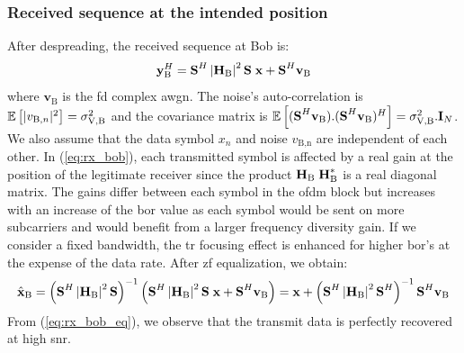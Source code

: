 \subsubsection{Received sequence at the intended position}
After despreading, the received sequence at Bob is:
\begin{equation}
    \textbf{y}_{\text{B}}^H = \textbf{S}^H  \left|\textbf{H}_{\text{B}}\right|^2\textbf{S}\; \textbf{x} +  \textbf{S}^H \textbf{v}_\text{B} 
    \label{eq:rx_bob}
\end{equation}
where $\textbf{v}_\text{B}$ is the \gls{fd} complex \gls{awgn}. The noise's auto-correlation is $\mathbb{E} \left[|v_{\text{B},n}|^2\right]  = \sigma_{\text{V,B}}^2$ and the covariance matrix is $\mathbb{E} \left[(\textbf{S}^H  \textbf{v}_\text{B}) . (\textbf{S}^H \textbf{v}_\text{B})^H\right] = \sigma_{\text{V,B}}^2 . \textbf{I}_N$. We also assume that the data symbol $x_n$ and noise $v_{\text{B,n}}$ are independent of each other. In (\ref{eq:rx_bob}), each transmitted symbol is affected by a real gain at the position of the legitimate receiver since the product $\textbf{H}_{\text{B}}\;\textbf{H}_{\text{B}}^*$ is a real diagonal matrix. The gains differ between each symbol in the \gls{ofdm} block but increases with an increase of the \gls{bor} value as each symbol would be sent on more subcarriers and would benefit from a larger frequency diversity gain. If we consider a fixed bandwidth, the \gls{tr} focusing effect is enhanced for higher \gls{bor}'s at the expense of the data rate. After \gls{zf} equalization, we obtain:
\begin{equation}
    \hat{\textbf{x}}_{\text{B}} = \left(\textbf{S}^H \left|\textbf{H}_{\text{B}}\right|^2\textbf{S}\right)^{-1} \left(\textbf{S}^H  \left|\textbf{H}_{\text{B}}\right|^2\textbf{S}\; \textbf{x} +  \textbf{S}^H \textbf{v}_\text{B}\right) = \textbf{x} + \left(\textbf{S}^H  \left|\textbf{H}_{\text{B}}\right|^2 \textbf{S}^H \right)^{-1} \textbf{S}^H \textbf{v}_\text{B}
    \label{eq:rx_bob_eq}
\end{equation}
From (\ref{eq:rx_bob_eq}), we observe that the transmit data is perfectly recovered at high \gls{snr}.




